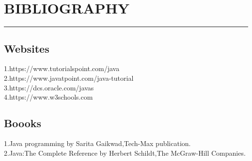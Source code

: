 \documentclass[12 pt,a4paper]{report}
\begin{document}
\chapter{BIBLIOGRAPHY}
\begin{center}
\rule{\textwidth}{2 pt}
\justify
\section{Websites}
{1.https://www.tutorialspoint.com/java}\\
{2.https://www.javatpoint.com/java-tutorial}\\
{3.https://dcs.oracle.com/javas}\\
{4.https://www.w3schools.com}
\section{Boooks}
{1.Java programming by Sarita Gaikwad,Tech-Max publication.}\\
{2.Java:The Complete Reference by Herbert Schildt,The McGraw-Hill Companies.}

\end{center}
\end{document}
